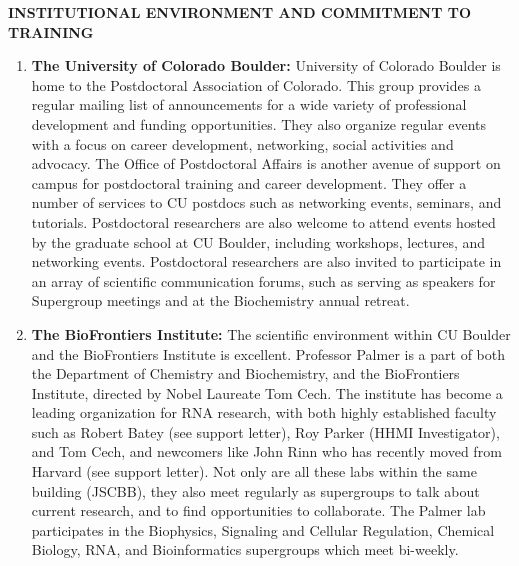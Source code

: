 \begin{center}
{\bf INSTITUTIONAL ENVIRONMENT AND COMMITMENT TO TRAINING}
\end{center}

\begin{enumerate}
  \item \textbf{The University of Colorado Boulder:} University of Colorado Boulder is home to the Postdoctoral Association of Colorado. This group provides a regular mailing list of announcements for a wide variety of professional development and funding opportunities. They also organize regular events with a focus on career development, networking, social activities and advocacy. The Office of Postdoctoral Affairs is another avenue of support on campus for postdoctoral training and career development. They offer a number of services to CU postdocs such as networking events, seminars, and tutorials. Postdoctoral researchers are also welcome to attend events hosted by the graduate school at CU Boulder, including workshops, lectures, and networking events. Postdoctoral researchers are also invited to participate in an array of scientific communication forums, such as serving as speakers for Supergroup meetings and at the Biochemistry annual retreat.

  \item \textbf{The BioFrontiers Institute:} The scientific environment within CU Boulder and the BioFrontiers Institute is excellent. Professor Palmer is a part of both the Department of Chemistry and Biochemistry, and the BioFrontiers Institute, directed by Nobel Laureate Tom Cech. The institute has become a leading organization for RNA research, with both highly established faculty such as Robert Batey (see support letter), Roy Parker (HHMI Investigator), and Tom Cech, and newcomers like John Rinn who has recently moved from Harvard (see support letter). Not only are all these labs within the same building (JSCBB), they also meet regularly as supergroups to talk about current research, and to find opportunities to collaborate. The Palmer lab participates in the Biophysics, Signaling and Cellular Regulation, Chemical Biology, RNA, and Bioinformatics supergroups which meet bi-weekly.


\end{enumerate}
